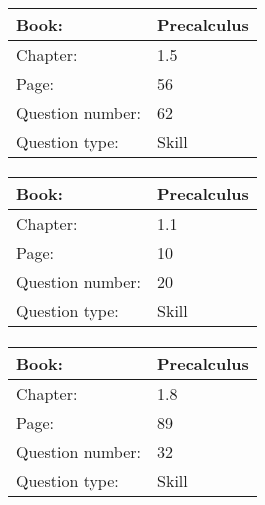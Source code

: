 \documentclass{article}
\begin{document}
            \paragraph{}
            \begin{tabularx}{1\textwidth}{
                    p{}
                    p{}
                }
                \toprule
                Book: & Precalculus
                \\
                \midrule
                Chapter: & 1.5
                \\
                \midrule
                Page: & 56
                \\
                \midrule
                Question number: & 62
                \\
                \midrule
                Question type: & Skill
                \\
                \bottomrule
            \end{tabularx}
            
            \paragraph{}
            \begin{tabularx}{1\textwidth}{
                    p{}
                    p{}
                }
                \toprule
                Book: & Precalculus
                \\
                \midrule
                Chapter: & 1.1
                \\
                \midrule
                Page: & 10
                \\
                \midrule
                Question number: & 20
                \\
                \midrule
                Question type: & Skill
                \\
                \bottomrule
            \end{tabularx}
            
            \paragraph{}
            \begin{tabularx}{1\textwidth}{
                    p{}
                    p{}
                }
                \toprule
                Book: & Precalculus
                \\
                \midrule
                Chapter: & 1.8
                \\
                \midrule
                Page: & 89
                \\
                \midrule
                Question number: & 32
                \\
                \midrule
                Question type: & Skill
                \\
                \bottomrule
            \end{tabularx}
            
\end{document}
